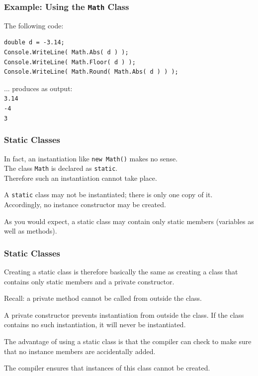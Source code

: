 \begin{frame}[fragile]
\frametitle{Example: Using the \texttt{Math} Class}

The following code:

\begin{verbatim}
double d = -3.14;
Console.WriteLine( Math.Abs( d ) );
Console.WriteLine( Math.Floor( d ) );
Console.WriteLine( Math.Round( Math.Abs( d ) ) );
\end{verbatim}

... produces as output:\\
\texttt{3.14\\
-4\\
3}

\end{frame}


\begin{frame}
\frametitle{Static Classes}
In fact, an instantiation like \texttt{new Math()} makes no sense.\\
\quad The class \texttt{Math} is declared as \texttt{static}.\\
\quad Therefore such an instantiation cannot take place.

A \texttt{static} class may not be instantiated; there is only one copy of it.\\
\quad Accordingly, no instance constructor may be created.

As you would expect, a static class may contain only static members (variables as well as methods).

\end{frame}

\begin{frame}
\frametitle{Static Classes}

Creating a static class is therefore basically the same as creating a class that contains only static members and a private constructor. 

Recall: a private method cannot be called from outside the class.

A private constructor prevents instantiation from outside the class. If the class contains no such instantiation, it will never be instantiated.

The advantage of using a static class is that the compiler can check to make sure that no instance members are accidentally added. 

The compiler ensures that instances of this class cannot be created.

\end{frame}



